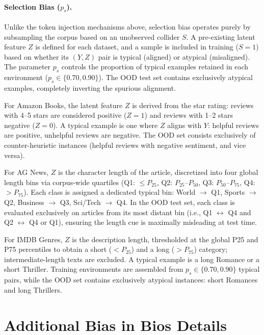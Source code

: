 \documentclass[11pt]{article}
\theoremstyle{definition}
\theoremstyle{plain}
\begin{document}
\paragraph{Selection Bias ($p_s$).} Unlike the token injection mechanisms above, selection bias operates purely by subsampling the corpus based on an unobserved collider $S$. A pre-existing latent feature $Z$ is defined for each dataset, and a sample is included in training ($S=1$) based on whether its $(Y,Z)$ pair is typical (aligned) or atypical (misaligned). The parameter $p_s$ controls the proportion of typical examples retained in each environment ($p_s \in \{0.70, 0.90\}$). The OOD test set contains exclusively atypical examples, completely inverting the spurious alignment.

For Amazon Books, the latent feature $Z$ is derived from the star rating: reviews with 4--5 stars are considered positive ($Z=1$) and reviews with 1--2 stars negative ($Z=0$). A typical example is one where $Z$ aligns with $Y$: helpful reviews are positive, unhelpful reviews are negative. The OOD set consists exclusively of counter-heuristic instances (helpful reviews with negative sentiment, and vice versa).

For AG News, $Z$ is the character length of the article, discretized into four global length bins via corpus-wide quartiles (Q1: $\leq P_{25}$, Q2: $P_{25}$--$P_{50}$, Q3: $P_{50}$--$P_{75}$, Q4: $> P_{75}$). Each class is assigned a dedicated typical bin: World $\rightarrow$ Q1, Sports $\rightarrow$ Q2, Business $\rightarrow$ Q3, Sci/Tech $\rightarrow$ Q4. In the OOD test set, each class is evaluated exclusively on articles from its most distant bin (i.e., Q1 $\leftrightarrow$ Q4 and Q2 $\leftrightarrow$ Q4 or Q1), ensuring the length cue is maximally misleading at test time.

For IMDB Genres, $Z$ is the description length, thresholded at the global P25 and P75 percentiles to obtain a short ($< P_{25}$) and a long ($> P_{75}$) category; intermediate-length texts are excluded. A typical example is a long Romance or a short Thriller. Training environments are assembled from $p_s \in \{0.70, 0.90\}$ typical pairs, while the OOD set contains exclusively atypical instances: short Romances and long Thrillers.


\section{Additional Bias in Bios Details}
\label{app:bib-details}
\end{document}
